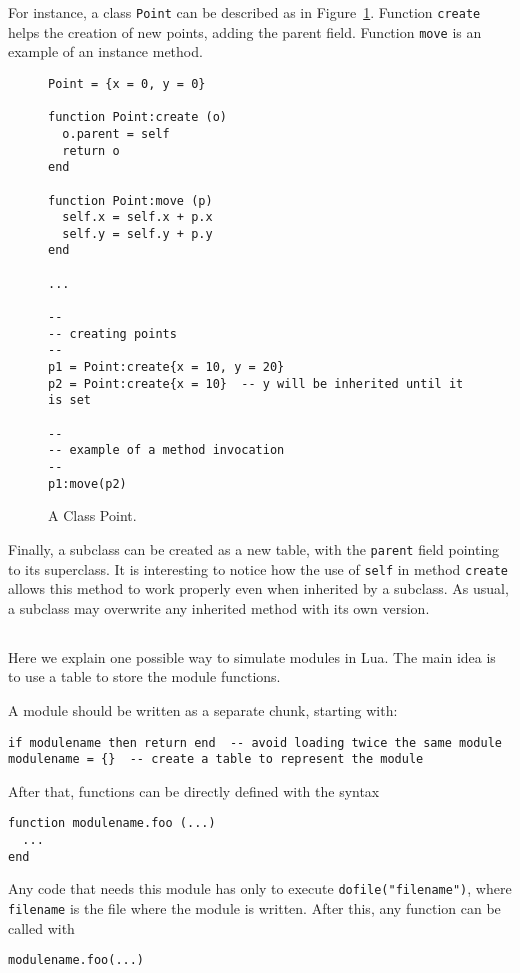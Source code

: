 For instance, a class \verb'Point' can be described as in
Figure~\ref{Point}.
Function \verb'create' helps the creation of new points,
adding the parent field.
Function \verb'move' is an example of an instance method.
\begin{figure}
\Line
\begin{verbatim}
Point = {x = 0, y = 0}

function Point:create (o)
  o.parent = self
  return o
end

function Point:move (p)
  self.x = self.x + p.x
  self.y = self.y + p.y
end

...

--
-- creating points
--
p1 = Point:create{x = 10, y = 20}
p2 = Point:create{x = 10}  -- y will be inherited until it is set

--
-- example of a method invocation
--
p1:move(p2)
\end{verbatim}
\caption{A Class Point.\label{Point}}
\Line
\end{figure}
Finally, a subclass can be created as a new table,
with the \verb'parent' field pointing to its superclass.
It is interesting to notice how the use of \verb'self' in
method \verb'create' allows this method to work properly even
when inherited by a subclass.
As usual, a subclass may overwrite any inherited method with
its own version.

\subsection{}
Here we explain one possible way to simulate modules in Lua.
The main idea is to use a table to store the module functions.

A module should be written as a separate chunk, starting with:
\begin{verbatim}
if modulename then return end  -- avoid loading twice the same module
modulename = {}  -- create a table to represent the module
\end{verbatim}
After that, functions can be directly defined with the syntax
\begin{verbatim}
function modulename.foo (...)
  ...
end
\end{verbatim}

Any code that needs this module has only to execute
\verb'dofile("filename")', where \verb'filename' is the file
where the module is written.
After this, any function can be called with
\begin{verbatim}
modulename.foo(...)
\end{verbatim}

